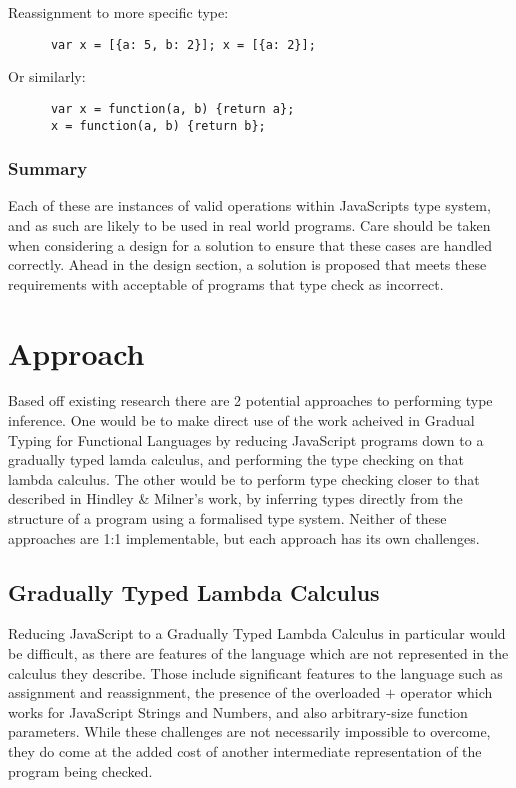 \documentclass[british, twoside]{bhamthesis}
\theoremstyle{definition}
\begin{document}
    Reassignment to more specific type:
    \begin{lstlisting}
      var x = [{a: 5, b: 2}]; x = [{a: 2}];
    \end{lstlisting}

    Or similarly:
    \begin{lstlisting}
      var x = function(a, b) {return a};
      x = function(a, b) {return b};
    \end{lstlisting}

  \subsubsection{Summary}

    Each of these are instances of valid operations within JavaScripts type system, and as such are likely to be used in real world programs. Care should be taken when considering a design for a solution to ensure that these cases are handled correctly. Ahead in the design section, a solution is proposed that meets these requirements with acceptable of programs that type check as incorrect.

  \section{Approach}

    Based off existing research there are 2 potential approaches to performing type inference. One would be to make direct use of the work acheived in Gradual Typing for Functional Languages\autocite{Siek2006} by reducing JavaScript programs down to a gradually typed lamda calculus, and performing the type checking on that lambda calculus. The other would be to perform type checking closer to that described in  Hindley \& Milner's work, by inferring types directly from the structure of a program using a formalised type system. Neither of these approaches are 1:1 implementable, but each approach has its own challenges.

  \subsection{Gradually Typed Lambda Calculus}

    Reducing JavaScript to a Gradually Typed Lambda Calculus in particular would be difficult, as there are features of the language which are not represented in the calculus they describe. Those include significant features to the language such as assignment and reassignment, the presence of the overloaded $+$ operator which works for JavaScript Strings and Numbers, and also arbitrary-size function parameters. While these challenges are not necessarily impossible to overcome, they do come at the added cost of another intermediate representation of the program being checked.
\end{document}
